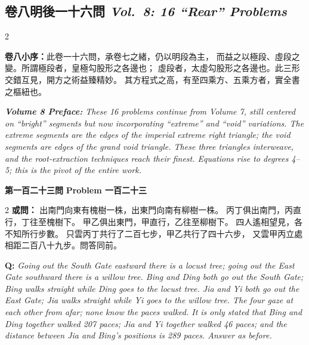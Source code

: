 \documentclass[11pt,a4paper]{article}
\newcommand{\wen}[1]{%
  \par\vspace{0.5em}%
  \noindent\textcolor{problemcolor}{\textbf{第#1問}}%
  \hfill\textcolor{problemcolor}{\textbf{Problem #1}}\par\nopagebreak%
  \vspace{0.3em}%
}
\newcommand{\owen}[1]{%
  \noindent\textcolor{problemcolor}{\textbf{或問：}}{\tradfont #1}\par\nopagebreak%
}
\newcommand{\oweneng}[1]{%
  \noindent\textcolor{engcolor}{\textbf{Q: }}{\itshape #1}\par\nopagebreak%
}
\newcommand{\bilingsubsec}[2]{%
  \subsection{\tradfont #1 \hfill\normalfont\normalsize\textit{#2}}%
}
\newcommand{\cnpar}[1]{{\tradfont #1\par}}
\newcommand{\enpar}[1]{{\itshape #1\par}}
\begin{document}
\vspace{0.5cm}

\newpage
\bilingsubsec{卷八\quad 明後一十六問}{Vol.~8: 16 ``Rear'' Problems}

\begin{paracol}{2}
\cnpar{%
\noindent\textbf{卷八小序：}此卷一十六問，承卷七之緒，仍以明段為主，
而益之以極段、虛段之變。所謂極段者，皇極勾股形之各邊也；
虛段者，太虛勾股形之各邊也。此三形交錯互見，開方之術益臻精妙。
其方程式之高，有至四乘方、五乘方者，實全書之樞紐也。}

\switchcolumn

\enpar{%
\noindent\textbf{Volume 8 Preface:} These 16 problems continue from Volume 7, still centered on ``bright'' segments but now incorporating ``extreme'' and ``void'' variations. The extreme segments are the edges of the imperial extreme right triangle; the void segments are edges of the grand void triangle. These three triangles interweave, and the root-extraction techniques reach their finest. Equations rise to degrees 4--5; this is the pivot of the entire work.}

\end{paracol}

\vspace{0.5cm}

\wen{一百二十三}

\begin{paracol}{2}
\owen{%
出南門向東有槐樹一株，出東門向南有柳樹一株。
丙丁俱出南門，丙直行，丁往至槐樹下。
甲乙俱出東門，甲直行，乙往至柳樹下。
四人遙相望見，各不知所行步數。
只雲丙丁共行了二百七步，甲乙共行了四十六步，
又雲甲丙立處相距二百八十九步。問答同前。}
\switchcolumn
\oweneng{%
Going out the South Gate eastward there is a locust tree; going out the East Gate southward there is a willow tree. Bing and Ding both go out the South Gate; Bing walks straight while Ding goes to the locust tree. Jia and Yi both go out the East Gate; Jia walks straight while Yi goes to the willow tree. The four gaze at each other from afar; none know the paces walked. It is only stated that Bing and Ding together walked 207 paces; Jia and Yi together walked 46 paces; and the distance between Jia and Bing's positions is 289 paces. Answer as before.}
\end{paracol}
\end{document}
